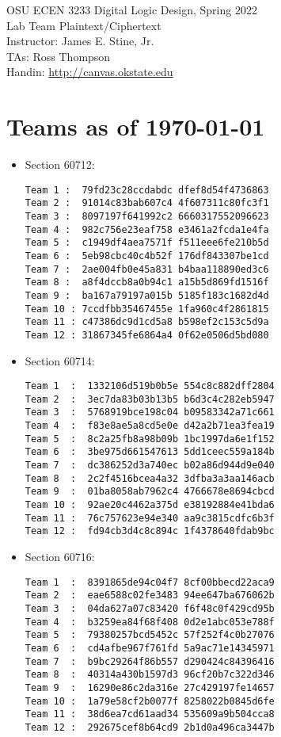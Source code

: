 \documentclass{article}
\newcommand{\mycourse}{\textsc OSU ECEN 3233 Digital Logic Design, Spring 2022}
\newcommand{\myassignment}{\textsc Lab Team Plaintext/Ciphertext}
\newcommand{\myinstructor}{Instructor: James E. Stine, Jr.}
\newcommand{\mytas}{TAs: Ross Thompson}
\newcommand{\myhandin}{Handin: \url{http://canvas.okstate.edu}}
\begin{document}
\begin{center}
  {\large \mycourse} \\
  \vspace{0.1in}
  {\large \myassignment} \\
  \vspace{0.25in} 
  \myinstructor \\
  \mytas \\
  \vspace{0.25in} 
  \myhandin \\
\end{center}

\vspace{0.25in}
\noindent

\section{Teams as of \today}

{\footnotesize
\begin{itemize}
\item Section 60712:  
\begin{verbatim}
Team 1 :  79fd23c28ccdabdc dfef8d54f4736863
Team 2 :  91014c83bab607c4 4f607311c80fc3f1
Team 3 :  8097197f641992c2 6660317552096623
Team 4 :  982c756e23eaf758 e3461a2fcda1e4fa
Team 5 :  c1949df4aea7571f f511eee6fe210b5d
Team 6 :  5eb98cbc40c4b52f 176df843307be1cd
Team 7 :  2ae004fb0e45a831 b4baa118890ed3c6
Team 8 :  a8f4dccb8a0b94c1 a15b5d869fd1516f
Team 9 :  ba167a79197a015b 5185f183c1682d4d
Team 10 : 7ccdfbb35467455e 1fa960c4f2861815
Team 11 : c47386dc9d1cd5a8 b598ef2c153c5d9a
Team 12 : 31867345fe6864a4 0f62e0506d5bd080
\end{verbatim}
\item Section 60714:
\begin{verbatim}
Team 1  :  1332106d519b0b5e 554c8c882dff2804 
Team 2  :  3ec7da83b03b13b5 b6d3c4c282eb5947
Team 3  :  5768919bce198c04 b09583342a71c661
Team 4  :  f83e8ae5a8cd5e0e d42a2b71ea3fea19
Team 5  :  8c2a25fb8a98b09b 1bc1997da6e1f152
Team 6  :  3be975d661547613 5dd1ceec559a184b
Team 7  :  dc386252d3a740ec b02a86d944d9e040
Team 8  :  2c2f4516bcea4a32 3dfba3a3aa146acb
Team 9  :  01ba8058ab7962c4 4766678e8694cbcd
Team 10 :  92ae20c4462a375d e38192884e41bda6
Team 11 :  76c757623e94e340 aa9c3815cdfc6b3f
Team 12 :  fd94cb3d4c8c894c 1f4378640fdab9bc
\end{verbatim}

\item Section 60716:
\begin{verbatim}
Team 1  :  8391865de94c04f7 8cf00bbecd22aca9
Team 2  :  eae6588c02fe3483 94ee647ba676062b
Team 3  :  04da627a07c83420 f6f48c0f429cd95b
Team 4  :  b3259ea84f68f408 0d2e1abc053e788f
Team 5  :  79380257bcd5452c 57f252f4c0b27076
Team 6  :  cd4afbe967f761fd 5a9ac71e14345971
Team 7  :  b9bc29264f86b557 d290424c84396416
Team 8  :  40314a430b1597d3 96cf20b7c322d346
Team 9  :  16290e86c2da316e 27c429197fe14657
Team 10 :  1a79e58cf2b0077f 8258022b0845d6fe
Team 11 :  38d6ea7cd61aad34 535609a9b504cca8
Team 12 :  292675cef8b64cd9 2b1d0a496ca3447b
\end{verbatim}

\end{itemize}
}




\end{document}
